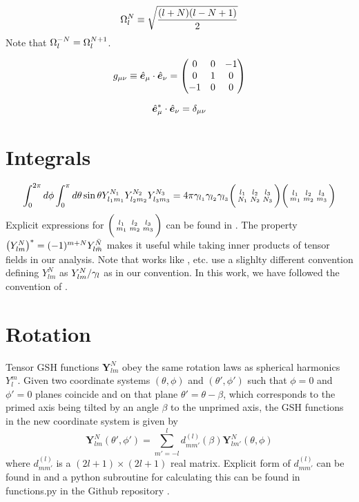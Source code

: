 \begin{equation}
\Omega_{l}^{N} \equiv \sqrt{\frac{(l+N)(l-N+1)}{2}}
\end{equation}
Note that $\Omega_{l}^{-N} = \Omega_{l}^{N+1}$.

\begin{equation}
g_{\mu\nu} \equiv \hat{\bm{e}}_{\mu}\cdot \hat{\bm{e}}_{\nu} = \left( \begin{matrix}
0 & 0 & -1 \\
0 & 1& 0  \\
-1 & 0 & 0
\end{matrix} \right)
\end{equation}

\begin{equation}
\hat{\bm{e}}_{\mu}^* \cdot \hat{\bm{e}}_{\nu} = \delta_{\mu\nu}
\end{equation}

\section{Integrals}
\begin{equation}
\int_0^{2\pi} d\phi \int_{0}^{\pi} d\theta\sin\theta Y_{l_1m_1}^{N_1}Y_{l_2m_2}^{N_2}Y_{l_3m_3}^{N_3} = 4\pi \gamma_{l_1}\gamma_{l_2}\gamma_{l_3} \bigg(\begin{smallmatrix} l_1 & l_2 & l_3 \\N_1 & N_2 & N_3 \end{smallmatrix}\bigg) \bigg(\begin{smallmatrix} l_1 & l_2 & l_3 \\m_1 & m_2 & m_3 \end{smallmatrix}\bigg)
\end{equation}
Explicit expressions for $\bigg(\begin{smallmatrix} l_1 & l_2 & l_3 \\m_1 & m_2 & m_3 \end{smallmatrix}\bigg)$ can be found in \cite{DT98}. The property $\left( Y_{lm}^{N} \right)^* = (-1)^{m+N}Y_{l\bar{m}}^{\bar{N}}$ makes it useful while taking inner products of tensor fields in our analysis.
Note that works like \cite{lavely92}, \cite{hanasoge17} etc. use a slighlty different convention defining $Y_{lm}^{N}$ as $Y_{lm}^{N}/\gamma_{l}$ as in our convention. In this work, we have followed the convention of \cite{DT98}.
\section{Rotation}

Tensor GSH functions $\mathbf{Y}_{lm}^N$ obey the same rotation laws as spherical harmonics $Y_{l}^{m}$. Given two coordinate systems $(\theta,\phi)$ and $(\theta',\phi')$ such that $\phi=0$ and $\phi'=0$ planes coincide and on that plane $\theta' = \theta-\beta$, which corresponds to the primed axis being tilted by an angle $\beta$ to the unprimed axis, the GSH functions in the new coordinate system is given by
\begin{equation}
\mathbf{Y}_{lm}^{N}(\theta',\phi') = \sum_{m'=-l}^{l} d_{mm'}^{(l)}(\beta) \mathbf{Y}_{lm'}^{N}(\theta,\phi)
\end{equation}
where $d_{mm'}^{(l)}$ is a $(2l+1)\times (2l+1)$ real matrix. Explicit form of $d^{(l)}_{mm'}$ can be found in \cite{DT98} and a python subroutine for calculating this can be found in functions.py in the Github repository \cite{main_repo}.

